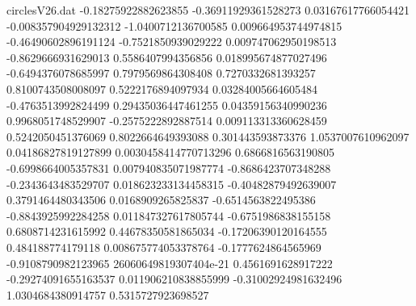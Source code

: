 \begin{filecontents}{circlesV26.dat}
-0.18275922882623855	-0.36911929361528273	0.03167617766054421
-0.008357904929132312	-1.0400712136700585	0.009664953744974815
-0.46490602896191124	-0.7521850939029222	0.009747062950198513
-0.8629666931629013	0.5586407994356856	0.018995674877027496
-0.6494376078685997	0.7979569864308408	0.7270332681393257
0.8100743508008097	0.5222176894097934	0.03284005664605484
-0.4763513992824499	0.29435036447461255	0.04359156340990236
0.9968051748529907	-0.2575222892887514	0.009113313360628459
0.5242050451376069	0.8022664649393088	0.301443593873376
1.0537007610962097	0.04186827819127899	0.0030458414770713296
0.6866816563190805	-0.6998664005357831	0.007940835071987774
-0.8686423707348288	-0.2343643483529707	0.018623233134458315
-0.40482879492639007	0.3791464480343506	0.0168909265825837
-0.6514563822495386	-0.8843925992284258	0.011847327617805744
-0.6751986838155158	0.6808714231615992	0.44678350581865034
-0.17206390120164555	0.484188774179118	0.008675774053378764
-0.1777624864565969	-0.9108790982123965	26060649819307404e-21
0.4561691628917222	-0.29274091655163537	0.011906210838855999
-0.31002924981632496	1.0304684380914757	0.5315727923698527
\end{filecontents}
